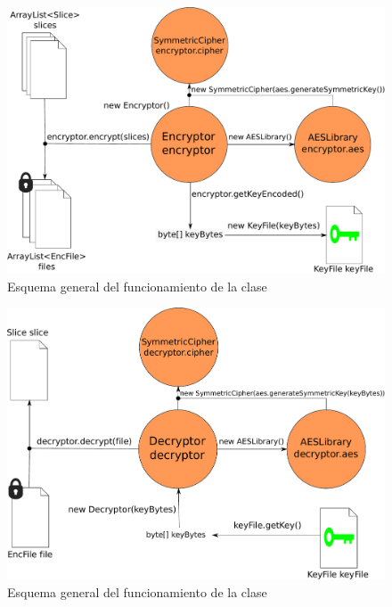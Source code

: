 \begin{figure}[!htb]
  \centering
  \includegraphics[scale=0.5]{Figures/Encryptor}
  \decoRule
  \caption[]{Esquema general del funcionamiento de la clase }
  \label{fig:Encryptor}
\end{figure}

\begin{figure}[!htb]
  \centering
  \includegraphics[scale=0.5]{Figures/Decryptor}
  \decoRule
  \caption[]{Esquema general del funcionamiento de la clase }
  \label{fig:Decryptor}
\end{figure}

